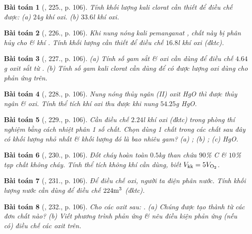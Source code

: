 \documentclass{article}
\newtheorem{baitoan}{Bài toán}
\begin{document}
\begin{baitoan}[\cite{An_400_BT_Hoa_Hoc_8_2020}, 225., p. 106]
	Tính khối lượng kali clorat cần thiết để điều chế được: (a) $24$\emph{g} khí oxi. (b) $33.6$\emph{l} khí oxi.
\end{baitoan}

\begin{baitoan}[\cite{An_400_BT_Hoa_Hoc_8_2020}, 226., p. 106]
	Khi nung nóng kali pemanganat \emph{}, chất này bị phân hủy cho \emph{} \& khí \emph{}. Tính khối lượng \emph{} cần thiết để điều chế $16.8$\emph{l} khí oxi (đktc). 
\end{baitoan}

\begin{baitoan}[\cite{An_400_BT_Hoa_Hoc_8_2020}, 227., p. 106]
	(a) Tính số gam sắt \& oxi cần dùng để điều chế $4.64$\emph{g} oxit sắt từ \emph{}. (b) Tính số gam kali clorat \emph{} cần dùng để có được lượng oxi dùng cho phản ứng trên.
\end{baitoan}

\begin{baitoan}[\cite{An_400_BT_Hoa_Hoc_8_2020}, 228., p. 106]
	Nung nóng thủy ngân (II) oxit \emph{HgO} thì được thủy ngân \& oxi. Tính thể tích khí oxi thu được khi nung $54.25$\emph{g} \emph{HgO}.
\end{baitoan}

\begin{baitoan}[\cite{An_400_BT_Hoa_Hoc_8_2020}, 229., p. 106]
	Cần điều chế $2.24$\emph{l} khí oxi (đktc) trong phòng thí nghiệm bằng cách nhiệt phân 1 số chất. Chọn dùng 1 chất trong các chất sau đây có khối lượng nhỏ nhất \& khối lượng đó là bao nhiêu gam? (a) \emph{}; (b) \emph{}; (c) \emph{HgO}.
\end{baitoan}

\begin{baitoan}[\cite{An_400_BT_Hoa_Hoc_8_2020}, 230., p. 106]
	Đốt cháy hoàn toàn $0.5$\emph{kg} than chứa $90$\% \emph{C} \& $10$\% tạp chất không cháy. Tính thể tích không khí cần dùng, biết $V_{\rm kk} = 5V_{\rm O_2}$.
\end{baitoan}

\begin{baitoan}[\cite{An_400_BT_Hoa_Hoc_8_2020}, 231., p. 106]
	Để điều chế oxi, người ta điện phân nước. Tính khối lượng nước cần dùng để điều chế $224{\rm m}^3$ \emph{} (đktc).
\end{baitoan}

\begin{baitoan}[\cite{An_400_BT_Hoa_Hoc_8_2020}, 232., p. 106]
	Cho các oxit sau: \emph{}. (a) Chúng được tạo thành từ các đơn chất nào? (b) Viết phương trình phản ứng \& nêu điều kiện phản ứng (nếu có) điều chế các oxit trên.
\end{baitoan}
\end{document}
